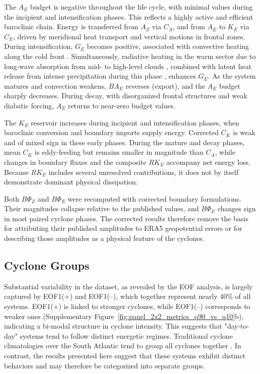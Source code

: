 \documentclass[pdflatex,sn-chicago]{sn-jnl}%
\theoremstyle{plain}
\theoremstyle{definition}
\theoremstyle{remark}
\theoremstyle{definition}
\begin{document}
The $A_E$ budget is negative throughout the life cycle, with minimal values during the incipient and intensification phases. This reflects a highly active and efficient baroclinic chain. Energy is transferred from $A_Z$ via $C_A$, and from $A_E$ to $K_E$ via $C_E$, driven by meridional heat transport and vertical motions in frontal zones. During intensification, $G_E$ becomes positive, associated with convective heating along the cold front \citep[e.g.,][]{govekar2011three}. Simultaneously, radiative heating in the warm sector due to long-wave absorption from mid- to high-level clouds \citep{lau1997comparing,keshtgar2023cloud}, combined with latent heat release from intense precipitation during this phase \citep{mcerlich2023assessment}, enhances $G_E$. As the system matures and convection weakens, $BA_E$ reverses (export), and the $A_E$ budget sharply decreases. During decay, with disorganized frontal structures and weak diabatic forcing, $A_E$ returns to near-zero budget values.

The $K_E$ reservoir increases during incipient and intensification phases, when baroclinic conversion and boundary imports supply energy. Corrected $C_K$ is weak and of mixed sign in these early phases. During the mature and decay phases, mean $C_K$ is eddy-feeding but remains smaller in magnitude than $C_A$, while changes in boundary fluxes and the composite $RK_E$ accompany net energy loss. Because $RK_E$ includes several unresolved contributions, it does not by itself demonstrate dominant physical dissipation.

Both $B\Phi_Z$ and $B\Phi_E$ were recomputed with corrected boundary formulations. Their magnitudes collapse relative to the published values, and $B\Phi_E$ changes sign in most paired cyclone phases. The corrected results therefore remove the basis for attributing their published amplitudes to ERA5 geopotential errors or for describing those amplitudes as a physical feature of the cyclones.


\subsection{Cyclone Groups}

Substantial variability in the dataset, as revealed by the EOF analysis, is largely captured by EOF1(+) and EOF1(–), which together represent nearly 40\% of all systems. EOF1(+) is linked to stronger cyclones, while EOF1(–) corresponds to weaker ones (Supplementary Figure~\ref{fig:panel_2x2_metrics_q90_vs_q10}b), indicating a bi-modal structure in cyclone intensity. This suggests that "day-to-day" systems tend to follow distinct energetic regimes. Traditional cyclone climatologies over the South Atlantic tend to group all cyclones together \citep[e.g.,]{sinclair1994objective,hoskins2005new,reboita2010south,gramcianinov2019properties}. In contrast, the results presented here suggest that these systems exhibit distinct behaviors and may therefore be categorized into separate groups.
\end{document}

